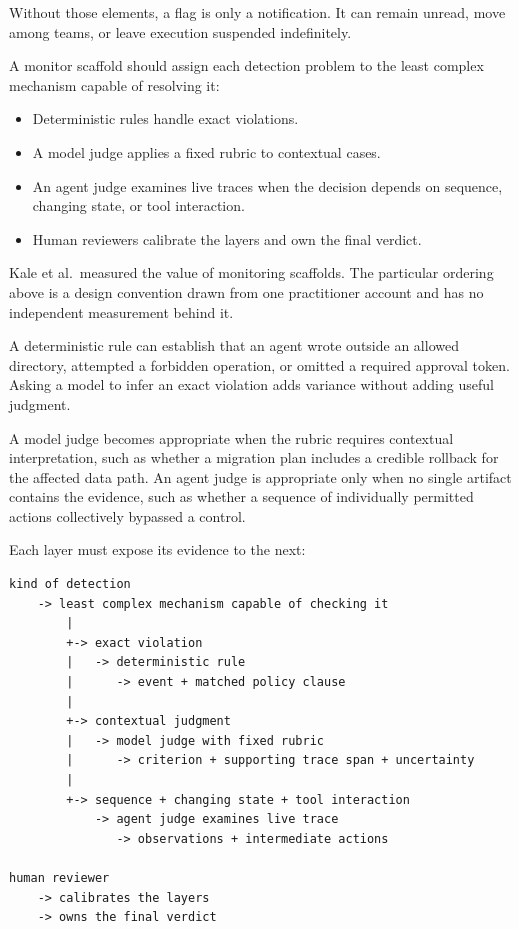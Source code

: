 Without those elements, a flag is only a notification. It can remain unread, move among teams, or leave execution suspended indefinitely.

A monitor scaffold should assign each detection problem to the least complex mechanism capable of resolving it:

\begin{itemize}
\tightlist
\item
  Deterministic rules handle exact violations.
\item
  A model judge applies a fixed rubric to contextual cases.
\item
  An agent judge examines live traces when the decision depends on sequence, changing state, or tool interaction.
\item
  Human reviewers calibrate the layers and own the final verdict.
\end{itemize}

Kale et al.~measured the value of monitoring scaffolds. The particular ordering above is a design convention drawn from one practitioner account and has no independent measurement behind it.

A deterministic rule can establish that an agent wrote outside an allowed directory, attempted a forbidden operation, or omitted a required approval token. Asking a model to infer an exact violation adds variance without adding useful judgment.

A model judge becomes appropriate when the rubric requires contextual interpretation, such as whether a migration plan includes a credible rollback for the affected data path. An agent judge is appropriate only when no single artifact contains the evidence, such as whether a sequence of individually permitted actions collectively bypassed a control.

Each layer must expose its evidence to the next:

\begin{verbatim}
kind of detection
    -> least complex mechanism capable of checking it
        |
        +-> exact violation
        |   -> deterministic rule
        |      -> event + matched policy clause
        |
        +-> contextual judgment
        |   -> model judge with fixed rubric
        |      -> criterion + supporting trace span + uncertainty
        |
        +-> sequence + changing state + tool interaction
            -> agent judge examines live trace
               -> observations + intermediate actions

human reviewer
    -> calibrates the layers
    -> owns the final verdict
\end{verbatim}


